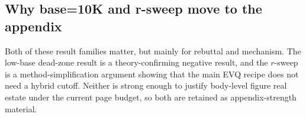 \subsection{Why base=10K and r-sweep move to the appendix}

Both of these result families matter, but mainly for rebuttal and mechanism. The low-base dead-zone result is a theory-confirming negative result, and the \(r\)-sweep is a method-simplification argument showing that the main EVQ recipe does not need a hybrid cutoff. Neither is strong enough to justify body-level figure real estate under the current page budget, so both are retained as appendix-strength material.
